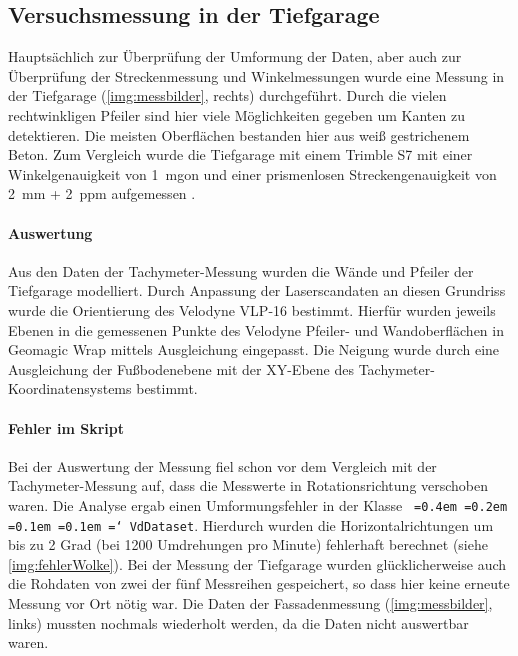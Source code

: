 \documentclass[a4paper,12pt,bibliography=totoc, listof=totoc,titlepage,pointlessnumbers]{scrreprt}
\newcommand*\justify{%
  \fontdimen2\font=0.4em%
  \fontdimen3\font=0.2em%
  \fontdimen4\font=0.1em%
  \fontdimen7\font=0.1em%
  \hyphenchar\font=`\-%
}
\newcommand{\code}[1]{\texttt{\justify{#1}}}
\begin{document}
\subsection{Versuchsmessung in der Tiefgarage}
Hauptsächlich zur Überprüfung der Umformung der Daten, aber auch zur Überprüfung der Streckenmessung und Winkelmessungen wurde eine Messung in der Tiefgarage (\autoref{img:messbilder}, rechts) durchgeführt. Durch die vielen rechtwinkligen Pfeiler sind hier viele Möglichkeiten gegeben um Kanten zu detektieren. Die meisten Oberflächen bestanden hier aus weiß gestrichenem Beton. Zum Vergleich wurde die Tiefgarage mit einem Trimble S7 mit einer Winkelgenauigkeit von 1~mgon und einer prismenlosen Streckengenauigkeit von 2~mm + 2~ppm aufgemessen \citep{trimbles7}.

\paragraph{Auswertung}
Aus den Daten der Tachymeter-Messung wurden die Wände und Pfeiler der Tiefgarage modelliert. Durch Anpassung der Laserscandaten an diesen Grundriss wurde die Orientierung des Velodyne VLP-16 bestimmt. Hierfür wurden jeweils Ebenen in die gemessenen Punkte des Velodyne Pfeiler- und Wandoberflächen in Geomagic Wrap mittels Ausgleichung eingepasst. Die Neigung wurde durch eine Ausgleichung der Fußbodenebene mit der XY-Ebene des Tachymeter-Koordinatensystems bestimmt. 

\paragraph{Fehler im Skript} Bei der Auswertung der Messung fiel schon vor dem Vergleich mit der Tachymeter-Messung auf, dass die Messwerte in Rotationsrichtung verschoben waren. Die Analyse ergab einen Umformungsfehler in der Klasse \code{VdDataset}. Hierdurch wurden die Horizontalrichtungen um bis zu 2 Grad (bei 1200 Umdrehungen pro Minute) fehlerhaft berechnet (siehe \autoref{img:fehlerWolke}). Bei der Messung der Tiefgarage wurden glücklicherweise auch die Rohdaten von zwei der fünf Messreihen gespeichert, so dass hier keine erneute Messung vor Ort nötig war. Die Daten der Fassadenmessung (\autoref{img:messbilder}, links) mussten nochmals wiederholt werden, da die Daten nicht auswertbar waren.
\end{document}

